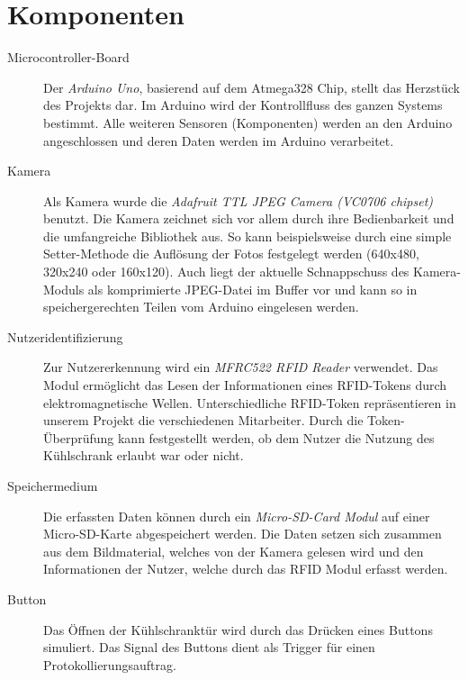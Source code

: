 \documentclass[a4paper, 11pt]{article}
\begin{document}
\section{Komponenten}
\begin{description}
\item [Microcontroller-Board] Der \textit{Arduino Uno}, basierend auf dem Atmega328 Chip, stellt das Herzstück des Projekts dar. Im Arduino wird der Kontrollfluss des ganzen Systems bestimmt. Alle weiteren Sensoren (Komponenten) werden an den Arduino angeschlossen und deren Daten werden im Arduino verarbeitet.
\item [Kamera] Als Kamera wurde die \textit{Adafruit TTL JPEG Camera (VC0706 chipset)} benutzt. Die Kamera zeichnet sich vor allem durch ihre Bedienbarkeit und die umfangreiche Bibliothek aus. So kann beispielsweise durch eine simple Setter-Methode die Auflösung der Fotos festgelegt werden (640x480, 320x240 oder 160x120). Auch liegt der aktuelle Schnappschuss des Kamera-Moduls als komprimierte JPEG-Datei im Buffer vor und kann so in speichergerechten Teilen vom Arduino eingelesen werden.
\item [Nutzeridentifizierung] Zur Nutzererkennung wird ein \textit{MFRC522 RFID Reader} verwendet. Das Modul ermöglicht das Lesen der Informationen eines RFID-Tokens durch elektromagnetische Wellen. Unterschiedliche RFID-Token repräsentieren in unserem Projekt die verschiedenen Mitarbeiter. Durch die Token-Überprüfung kann festgestellt werden, ob dem Nutzer die Nutzung des Kühlschrank erlaubt war oder nicht. 
\item [Speichermedium] Die erfassten Daten können durch ein \textit{Micro-SD-Card Modul} auf einer Micro-SD-Karte abgespeichert werden. Die Daten setzen sich zusammen aus dem Bildmaterial, welches von der Kamera gelesen wird und den Informationen der Nutzer, welche durch das RFID Modul erfasst werden.
\item [Button] Das Öffnen der Kühlschranktür wird durch das Drücken eines Buttons simuliert. Das Signal des Buttons dient als Trigger für einen Protokollierungsauftrag.
\end{description}
\end{document}
